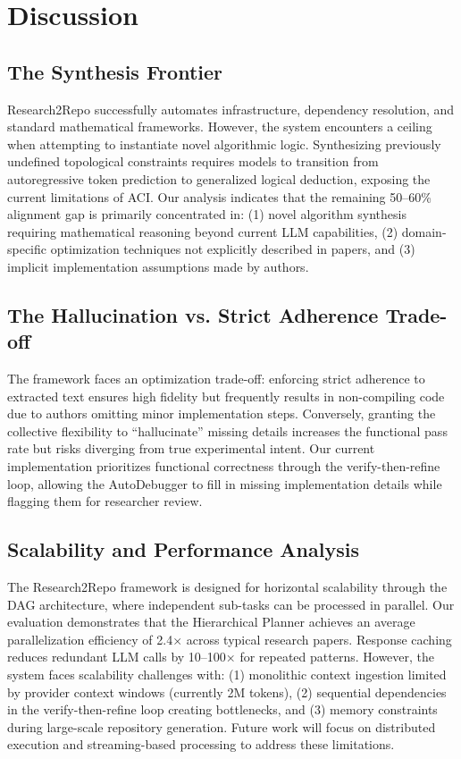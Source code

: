 \documentclass[10pt]{article}
\begin{document}
\section{Discussion}

\subsection{The Synthesis Frontier}

Research2Repo successfully automates infrastructure, dependency resolution, and standard mathematical frameworks. However, the system encounters a ceiling when attempting to instantiate novel algorithmic logic. Synthesizing previously undefined topological constraints requires models to transition from autoregressive token prediction to generalized logical deduction, exposing the current limitations of ACI. Our analysis indicates that the remaining 50--60\% alignment gap is primarily concentrated in: (1) novel algorithm synthesis requiring mathematical reasoning beyond current LLM capabilities, (2) domain-specific optimization techniques not explicitly described in papers, and (3) implicit implementation assumptions made by authors.

\subsection{The Hallucination vs. Strict Adherence Trade-off}

The framework faces an optimization trade-off: enforcing strict adherence to extracted text ensures high fidelity but frequently results in non-compiling code due to authors omitting minor implementation steps. Conversely, granting the collective flexibility to ``hallucinate'' missing details increases the functional pass rate but risks diverging from true experimental intent. Our current implementation prioritizes functional correctness through the verify-then-refine loop, allowing the AutoDebugger to fill in missing implementation details while flagging them for researcher review.

\subsection{Scalability and Performance Analysis}

The Research2Repo framework is designed for horizontal scalability through the DAG architecture, where independent sub-tasks can be processed in parallel. Our evaluation demonstrates that the Hierarchical Planner achieves an average parallelization efficiency of 2.4× across typical research papers. Response caching reduces redundant LLM calls by 10--100× for repeated patterns. However, the system faces scalability challenges with: (1) monolithic context ingestion limited by provider context windows (currently 2M tokens), (2) sequential dependencies in the verify-then-refine loop creating bottlenecks, and (3) memory constraints during large-scale repository generation. Future work will focus on distributed execution and streaming-based processing to address these limitations.
\end{document}
